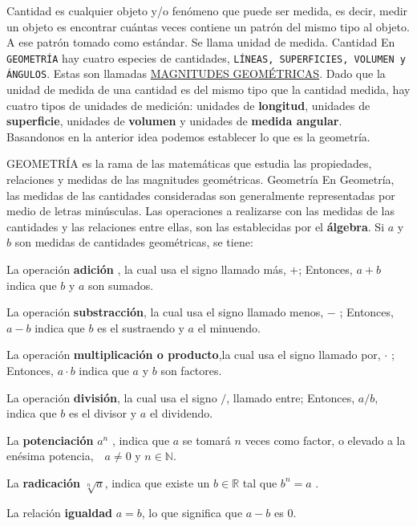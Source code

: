 \documentclass[12pt]{book}
\begin{document}
\begin{ideas}{ Cantidad es cualquier objeto y/o fenómeno que puede ser medida, es decir,
medir un objeto es encontrar cuántas veces contiene un patrón del mismo tipo al objeto.
A ese patrón tomado como estándar. Se llama  unidad de medida.
}{Cantidad}
En \texttt{GEOMETRÍA} hay cuatro especies de cantidades, \texttt{LÍNEAS,
SUPERFICIES, VOLUMEN y
ÁNGULOS}. Estas son llamadas \underline{MAGNITUDES GEOMÉTRICAS}.
Dado que la unidad de medida de una cantidad es del mismo tipo que la cantidad
medida, hay cuatro tipos de unidades de medición: unidades de \textbf{longitud}, unidades
de \textbf{superficie}, unidades de \textbf{volumen} y unidades de \textbf{medida angular}. \\
Basandonos en la anterior idea podemos establecer lo que es la geometría.
\begin{ideas}{GEOMETRÍA es la rama de las matemáticas que estudia las propiedades, relaciones y
medidas de las magnitudes geométricas.
}{Geometría}
En Geometría, las medidas de las cantidades consideradas son generalmente representadas por
medio de letras minúsculas. Las operaciones a realizarse con las medidas de las cantidades
y las relaciones entre ellas, son las establecidas por el \textbf{álgebra}.
Si $a$ y $b$ son medidas de  cantidades geométricas, se tiene:
\begin{lista}
 \item La operación \textbf{adición} , la cual usa el signo llamado más, $+$;
 Entonces, $a + b$ indica que $b$ y $a$ son sumados.
\item La operación \textbf{substracción}, la cual usa el signo llamado menos, $-$ ;
Entonces, $a-b$ indica que $b$ es el sustraendo y $a$ el minuendo.
\item La operación \textbf{multiplicación o producto},la cual usa el signo llamado por, $\cdot$ ;
Entonces, $a \cdot b$ indica que $a$ y $b$ son factores.
\item La operación \textbf{división}, la cual usa el signo $/$, llamado entre;
Entonces, $a/b$, indica que $b$ es el divisor y $a$ el dividendo.
\item La \textbf{potenciación} $a^n$ , indica que $a$ se tomará $n$ veces como factor,
 o elevado a la enésima potencia,\, \nota \, $a\neq 0$ y $n \in \mathbb{N}$.
\item La \textbf{radicación} $\sqrt[n]{a}$, indica que existe
 un $b \in \mathbb{R}$ tal que  $b^n=a$ .
\item La relación \textbf{igualdad} $a=b$,
lo que significa que $a-b$ es $0$.

\end{lista}
\end{ideas}
\end{ideas}
\end{document}
